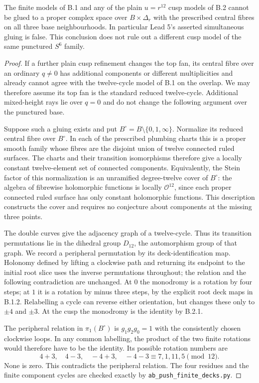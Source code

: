 \begin{theorem}\label{push:src:B.3.1}\label{push:B31}
The finite models of B.1 and any of the plain
$u=r^{12}$ cusp models of B.2 cannot be glued to a
proper complex space over $B\times\Delta_r$ with
the prescribed central fibres on all three base
neighbourhoods. In particular Lead 5's asserted
simultaneous gluing is false. This conclusion does
not rule out a different cusp model of the same
punctured $S^6$ family.
\end{theorem}
\begin{proof}
If a further plain cusp refinement changes the top fan,
its central fibre over an ordinary $q\ne0$ has additional
components or different multiplicities and already cannot
agree with the twelve-cycle model of B.1 on the overlap.
We may therefore assume its top fan is the standard reduced
twelve-cycle. Additional mixed-height rays lie over $q=0$
and do not change the following argument over the punctured
base.

Suppose such a gluing exists and put
$B^\circ=B\setminus\{0,1,\infty\}$. Normalize
its reduced central fibre over $B^\circ$. In
each of the prescribed plumbing charts this is
a proper smooth family whose fibres are the
disjoint union of twelve connected ruled
surfaces. The charts and their transition
isomorphisms therefore give a locally constant
twelve-element set of connected components.
Equivalently, the Stein factor of this
normalization is an unramified degree-twelve
cover of $B^\circ$: the algebra of fibrewise
holomorphic functions is locally $\mathcal O^{12}$,
since each proper connected ruled surface has
only constant holomorphic functions. This
description constructs the cover and requires
no conjecture about components at the missing
three points.

The double curves give the adjacency graph of
a twelve-cycle. Thus its transition
permutations lie in the dihedral group
$D_{12}$, the automorphism group of that graph.
We record a peripheral permutation by its
deck-identification map. Holonomy defined by
lifting a clockwise path and returning its
endpoint to the initial root slice uses the
inverse permutations throughout; the relation
and the following contradiction are unchanged.
At $0$ the monodromy is a rotation by four
steps; at $1$ it is a rotation by minus three
steps, by the explicit root deck maps in
B.1.2. Relabelling a cycle can reverse either
orientation, but changes these only to
$\pm4$ and $\pm3$. At the cusp the
monodromy is the identity by B.2.1.

The peripheral relation in
$\pi_1(B^\circ)$ is $g_1g_2g_0=1$ with
the consistently chosen clockwise loops.
In any common labelling, the product of the
two finite rotations would therefore have
to be the identity. Its possible rotation
numbers are
\[
 4+3,\quad4-3,\quad-4+3,\quad-4-3
 \equiv7,1,11,5\pmod {12}.
\]
None is zero. This contradicts the peripheral
relation. The four residues and the finite
component cycles are checked exactly by
\texttt{ab\_push\_finite\_decks.py}.
\end{proof}

